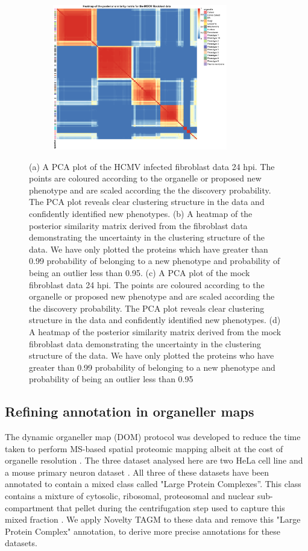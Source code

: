 \documentclass[12pt,english]{article}
\begin{document}
\begin{figure}
\begin{subfigure}[t]{0.5\textwidth}
	\centering
	\includegraphics[height=2.5in]{heatmapMOCK.pdf}
	\caption{}
\end{subfigure}
\caption{(a) A PCA plot of the HCMV infected fibroblast data 24 hpi. The points are coloured according to the organelle or proposed new phenotype and are scaled according the the discovery probability. The PCA plot reveals clear clustering structure in the data and confidently identified new phenotypes. (b) A heatmap of the posterior similarity matrix derived from the fibroblast data demonstrating the uncertainty in the clustering structure of the data. We have only plotted the proteins which have greater than 0.99 probability of belonging to a new phenotype and probability of being an outlier less than 0.95. (c) A PCA plot of the mock fibroblast data 24 hpi. The points are coloured according to the organelle or proposed new phenotype and are scaled according the the discovery probability. The PCA plot reveals clear clustering structure in the data and confidently identified new phenotypes. (d)  A heatmap of the posterior similarity matrix derived from the mock fibroblast data demonstrating the uncertainty in the clustering structure of the data. We have only plotted the proteins who have greater than 0.99 probability of belonging to a new phenotype and probability of being an outlier less than 0.95}
 \label{figure:Beltran}
\end{figure}
\clearpage
\subsection{Refining annotation in organeller maps}
The dynamic organeller map (DOM) protocol was developed to reduce the time taken to perform MS-based spatial proteomic mapping albeit at the cost of organelle resolution \citep{Itzhak:2016,Gatto:2018}. The three dataset analysed here are two HeLa cell line \citep{Itzhak:2016, Hirst:2018} and a mouse primary neuron dataset \citep{Itzhak::2017}. All three of these datasets have been annotated to contain a mixed class called "Large Protein Complexes''. This class contains a mixture of cytosolic, ribosomal, proteosomal and nuclear sub-compartment that pellet during the centrifugation step used to capture this mixed fraction \citep{Itzhak:2016}. We apply Novelty TAGM to these data and remove this "Large Protein Complex" annotation, to derive more precise annotations for these datasets. 
\end{document}
